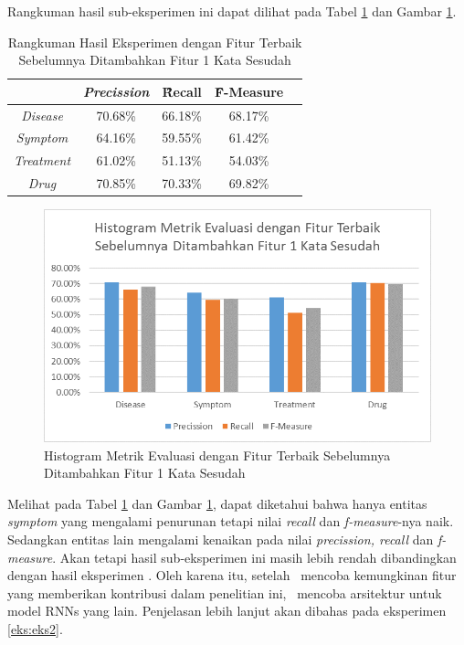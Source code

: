 	Rangkuman hasil sub-eksperimen ini dapat dilihat pada Tabel \ref{table:owndict8} dan Gambar \ref{fig:owndict8}.
	
	\begin{table}
		\centering
		\caption{Rangkuman Hasil Eksperimen dengan Fitur Terbaik Sebelumnya Ditambahkan Fitur 1 Kata Sesudah}
		\begin{tabular}{|c|c|c|c|c|}
			\hline
			& \textit{Precission} & \f{\f{Recall}} & \f{\f{F-Measure}} \\ \hline
			\textit{Disease}      & 70.68\%             & 66.18\%        & 68.17\%           \\ \hline
			\textit{Symptom}      & 64.16\%             & 59.55\%        & 61.42\%           \\ \hline
			\textit{Treatment}    & 61.02\%             & 51.13\%        & 54.03\%           \\ \hline
			\textit{Drug}		  & 70.85\%             & 70.33\%        & 69.82\%           \\ \hline
		\end{tabular}
		\label{table:owndict8}
	\end{table}
	
	\begin{figure}
		\centering
		\includegraphics[width=0.85\linewidth]{images/histogram8}
		\caption{Histogram Metrik Evaluasi dengan Fitur Terbaik Sebelumnya Ditambahkan Fitur 1 Kata Sesudah}
		\label{fig:owndict8}
	\end{figure}
	
	Melihat pada Tabel \ref{table:owndict8} dan Gambar \ref{fig:owndict8}, dapat diketahui bahwa hanya entitas \textit{symptom} yang mengalami penurunan tetapi nilai \textit{recall} dan \textit{f-measure}-nya naik. Sedangkan entitas lain mengalami kenaikan pada nilai \textit{precission, recall} dan \textit{f-measure}. Akan tetapi hasil sub-eksperimen ini masih lebih rendah dibandingkan dengan hasil eksperimen \cite{skripsiKakRadit}. Oleh karena itu, setelah \saya~mencoba kemungkinan fitur yang memberikan kontribusi dalam penelitian ini, \penulis~mencoba arsitektur untuk model RNNs yang lain. Penjelasan lebih lanjut akan dibahas pada eksperimen \ref{eks:eks2}.
	
